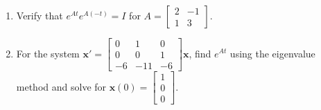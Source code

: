 \begin{question}
\begin{enumerate}
          \item Verify that $e^{At} e^{A(-t)} = I$ for $A = \begin{bmatrix} 2 & -1 \\ 1 & 3 \end{bmatrix}$.

          \item For the system $\mathbf{x}' = \begin{bmatrix} 0 & 1 & 0 \\ 0 & 0 & 1 \\ -6 & -11 & -6 \end{bmatrix} \mathbf{x}$, find $e^{At}$ using the eigenvalue method and solve for $\mathbf{x}(0) = \begin{bmatrix} 1 \\ 0 \\ 0 \end{bmatrix}$.
        \end{enumerate}
      \end{question}



